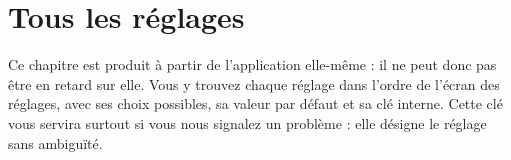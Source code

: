\chapter{Tous les réglages}\label{chap:all-settings}
Ce chapitre est produit à partir de l'application elle-même : il ne peut donc pas être en retard sur elle. Vous y
trouvez chaque réglage dans l'ordre de l'écran des réglages, avec ses choix possibles, sa valeur par défaut et sa
clé interne. Cette clé vous servira surtout si vous nous signalez un problème : elle désigne le réglage sans
ambiguïté.

